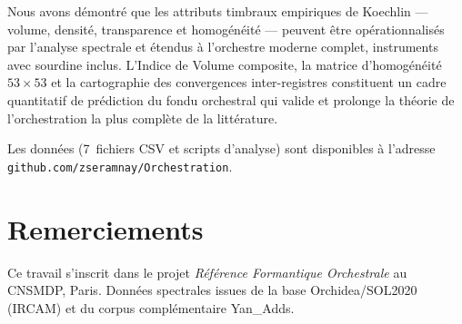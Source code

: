 \documentclass[journal]{IEEEtran}
\begin{document}
Nous avons démontré que les attributs timbraux empiriques de Koechlin --- volume, densité, transparence et homogénéité --- peuvent être opérationnalisés par l'analyse spectrale et étendus à l'orchestre moderne complet, instruments avec sourdine inclus. L'Indice de Volume composite, la matrice d'homogénéité $53 \times 53$ et la cartographie des convergences inter-registres constituent un cadre quantitatif de prédiction du fondu orchestral qui valide et prolonge la théorie de l'orchestration la plus complète de la littérature.

Les données (7~fichiers CSV et scripts d'analyse) sont disponibles à l'adresse \texttt{github.com/zseramnay/Orchestration}.

\section*{Remerciements}
Ce travail s'inscrit dans le projet \textit{Référence Formantique Orchestrale} au CNSMDP, Paris. Données spectrales issues de la base Orchidea/SOL2020 (IRCAM) et du corpus complémentaire Yan\_Adds.
\end{document}
